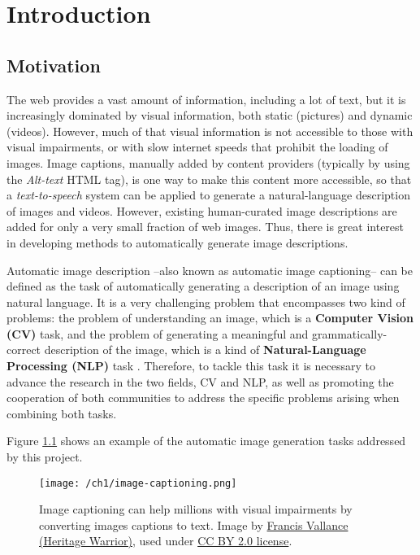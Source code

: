 \chapter{Introduction}
\label{chapter:introduccion}

\section{Motivation}

The web provides a vast amount of information, including a lot of text, but it is increasingly dominated by visual information, both static (pictures) and dynamic (videos).  However, much of that visual information is not accessible to those with visual impairments, or with slow internet speeds that prohibit the loading of images. Image captions, manually added by content providers (typically by using the \textit{ Alt-text} HTML tag), is one way to make this content more accessible, so that a \textit{text-to-speech} system can be applied to generate a natural-language description of images and videos. However, existing human-curated image descriptions are added for only a very small fraction of web images. Thus, there is great interest in developing methods to automatically generate image descriptions.

Automatic image description --also known as automatic image captioning-- can be defined as the task of automatically generating a description of an image using natural language. It is a very challenging problem that encompasses two kind of problems: the problem of understanding an image, which is a \textbf{Computer Vision (CV)} task, and the problem of generating a meaningful and grammatically-correct description of the image, which is a kind of \textbf{Natural-Language Processing (NLP)} task . Therefore, to tackle this task it is necessary to advance the research in the two fields, CV and NLP, as well as promoting the cooperation of both communities to address the specific problems arising when combining both tasks.

Figure \ref{fig:image-captioning} shows an example of the automatic image generation tasks addressed by this project.

\begin{figure}[hpt]
	\centering
	\texttt{[image: /ch1/image-captioning.png]}
	\caption{Image captioning can help millions with visual impairments by converting images captions to text. Image by \href{https://www.flickr.com/photos/francisvallance/}{Francis Vallance (Heritage Warrior)}, used under \href{https://creativecommons.org/licenses/by/2.0/}{CC BY 2.0 license}.}
	\label{fig:image-captioning}
\end{figure}

